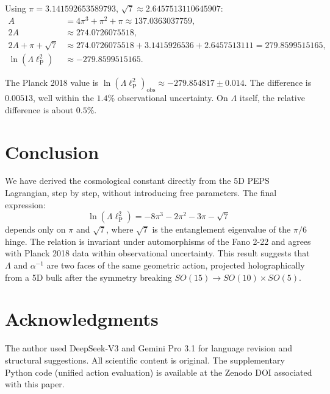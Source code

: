 \documentclass[12pt]{article}
\begin{document}
Using \(\pi = 3.141592653589793\), \(\sqrt{7} \approx 2.6457513110645907\):
\begin{align}
A &= 4\pi^3 + \pi^2 + \pi \approx 137.0363037759,\\
2A &\approx 274.0726075518,\\
2A + \pi + \sqrt{7} &\approx 274.0726075518 + 3.1415926536 + 2.6457513111 = 279.8599515165,\\
\ln(\Lambda \ell_{\text{P}}^2) &\approx -279.8599515165.
\end{align}

The Planck 2018 value is \(\ln(\Lambda \ell_{\text{P}}^2)_{\text{obs}} \approx -279.854817 \pm 0.014\). The difference is \(0.00513\), well within the \(1.4\%\) observational uncertainty. On \(\Lambda\) itself, the relative difference is about \(0.5\%\).

\section{Conclusion}

We have derived the cosmological constant directly from the 5D PEPS Lagrangian, step by step, without introducing free parameters. The final expression:
\begin{equation}
\boxed{\ln(\Lambda \ell_{\text{P}}^2) = -8\pi^3 - 2\pi^2 - 3\pi - \sqrt{7}}
\end{equation}
depends only on \(\pi\) and \(\sqrt{7}\), where \(\sqrt{7}\) is the entanglement eigenvalue of the \(\pi/6\) hinge. The relation is invariant under automorphisms of the Fano 2-22 and agrees with Planck 2018 data within observational uncertainty. This result suggests that \(\Lambda\) and \(\alpha^{-1}\) are two faces of the same geometric action, projected holographically from a 5D bulk after the symmetry breaking \(SO(15) \to SO(10) \times SO(5)\).

\section*{Acknowledgments}
The author used DeepSeek-V3 and Gemini Pro 3.1 for language revision and structural suggestions. All scientific content is original. The supplementary Python code (unified action evaluation) is available at the Zenodo DOI associated with this paper.
\end{document}

